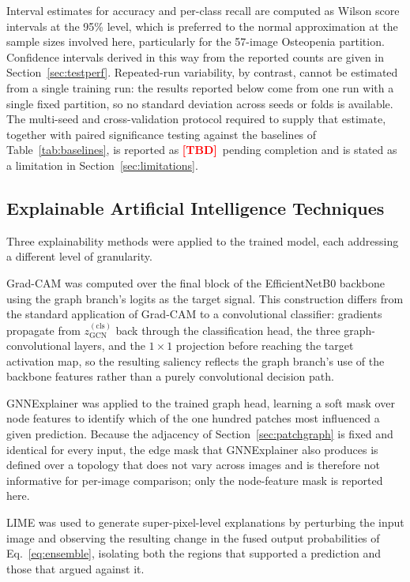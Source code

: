 \documentclass[journal]{IEEEtran}
\newcommand{\PEND}{\textcolor{red}{\textbf{[TBD]}}}
\begin{document}
\label{sec:statistics}
Interval estimates for accuracy and per-class recall are computed as Wilson
score intervals at the 95\% level, which is preferred to the normal
approximation at the sample sizes involved here, particularly for the 57-image
Osteopenia partition. Confidence intervals derived in this way from the reported
counts are given in Section~\ref{sec:testperf}. Repeated-run variability, by
contrast, cannot be estimated from a single training run: the results reported
below come from one run with a single fixed partition, so no standard deviation
across seeds or folds is available. The multi-seed and cross-validation protocol
required to supply that estimate, together with paired significance testing
against the baselines of Table~\ref{tab:baselines}, is reported as \PEND\
pending completion and is stated as a limitation in
Section~\ref{sec:limitations}.

\subsection{Explainable Artificial Intelligence Techniques}
\label{sec:xai}
Three explainability methods were applied to the trained model, each addressing
a different level of granularity.

Grad-CAM \cite{gradcam} was computed over the final block of the EfficientNetB0
backbone using the graph branch's logits as the target signal. This
construction differs from the standard application of Grad-CAM to a
convolutional classifier: gradients propagate from
$z_{\text{GCN}}^{(\text{cls})}$ back through the classification head, the three
graph-convolutional layers, and the $1\times1$ projection before reaching the
target activation map, so the resulting saliency reflects the graph branch's use
of the backbone features rather than a purely convolutional decision path.

GNNExplainer \cite{ying2019gnnexplainer} was applied to the trained graph head,
learning a soft mask over node features to identify which of the one hundred
patches most influenced a given prediction. Because the adjacency of
Section~\ref{sec:patchgraph} is fixed and identical for every input, the edge
mask that GNNExplainer also produces is defined over a topology that does not
vary across images and is therefore not informative for per-image comparison;
only the node-feature mask is reported here.

LIME \cite{lime} was used to generate super-pixel-level explanations by
perturbing the input image and observing the resulting change in the fused
output probabilities of Eq.~\eqref{eq:ensemble}, isolating both the regions that
supported a prediction and those that argued against it.
\end{document}
